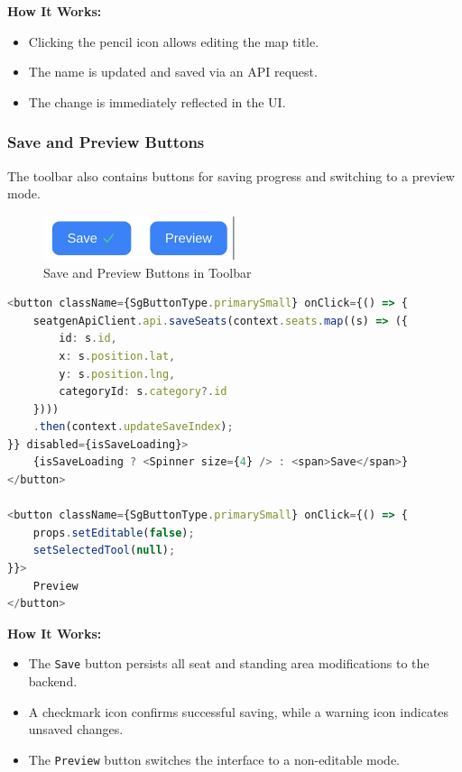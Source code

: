 \textbf{How It Works:}
\begin{itemize}
    \item Clicking the pencil icon allows editing the map title.
    \item The name is updated and saved via an API request.
    \item The change is immediately reflected in the UI.
\end{itemize}

\subsubsection{Save and Preview Buttons}
The toolbar also contains buttons for saving progress and switching to a preview mode.

\begin{figure}[H]
    \centering
    \includegraphics[width=0.5\textwidth]{pics/toolbar02.png}
    \caption{Save and Preview Buttons in Toolbar}
    \label{fig:toolbar-save-preview}
\end{figure}

\begin{lstlisting}[language=TypeScript, caption=Saving and Previewing, label=lst:toolbar-save-preview]
<button className={SgButtonType.primarySmall} onClick={() => {
    seatgenApiClient.api.saveSeats(context.seats.map((s) => ({
        id: s.id,
        x: s.position.lat,
        y: s.position.lng,
        categoryId: s.category?.id
    })))
    .then(context.updateSaveIndex);
}} disabled={isSaveLoading}>
    {isSaveLoading ? <Spinner size={4} /> : <span>Save</span>}
</button>

<button className={SgButtonType.primarySmall} onClick={() => {
    props.setEditable(false);
    setSelectedTool(null);
}}>
    Preview
</button>
\end{lstlisting}

\textbf{How It Works:}
\begin{itemize}
    \item The \texttt{Save} button persists all seat and standing area modifications to the backend.
    \item A checkmark icon confirms successful saving, while a warning icon indicates unsaved changes.
    \item The \texttt{Preview} button switches the interface to a non-editable mode.
\end{itemize}

